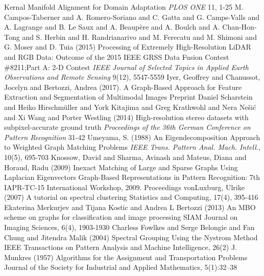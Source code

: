 \documentclass{beamer}
\begin{document}
\begin{frame}[allowframebreaks]
{\begin{thebibliography}{99}
      \newblock Kernal Manifold Alignment for Domain Adaptation
      \newblock \emph{PLOS ONE} 11, 1-25
     M. Campos-Taberner and A. Romero-Soriano and C. Gatta and G. Camps-Valls and A. Lagrange and B. Le Saux and A. Beaupère and A. Boulch and A. Chan-Hon-Tong and S. Herbin and H. Randrianarivo and M. Ferecatu and M. Shimoni and G. Moser and D. Tuia (2015)
      \newblock Processing of Extremely High-Resolution LiDAR and RGB Data: Outcome of the 2015 IEEE GRSS Data Fusion Contest \#8211;Part A: 2-D Contest
      \newblock \emph{IEEE Journal of Selected Topics in Applied Earth Observations and Remote Sensing} 9(12), 5547-5559
     Iyer, Geoffrey and Chanussot, Jocelyn and Bertozzi, Andrea (2017).
      \newblock A Graph-Based Approach for Feature Extraction and Segmentation of Multimodal Images
      \newblock Preprint
     Daniel Scharstein and Heiko Hirschm\"{u}ller and York Kitajima and Greg Krathwohl and Nera Ne\v{s}i\'{c} and Xi Wang and Porter Westling (2014)
      \newblock High-resolution stereo datasets with subpixel-accurate ground truth
      \newblock \emph{Proceedings of the 36th German Conference on Pattern Recognition} 31-42
     Umeyama, S. (1988)
      \newblock An Eigendecomposition Approach to Weighted Graph Matching Problems
      \newblock \emph{IEEE Trans. Pattern Anal. Mach. Intell.}, 10(5), 695-703
     Knossow, David and Sharma, Avinash and Mateus, Diana and Horaud, Radu (2009)
      \newblock Inexact Matching of Large and Sparse Graphs Using Laplacian Eigenvectors
      \newblock Graph-Based Representations in Pattern Recognition: 7th IAPR-TC-15 International Workshop, 2009. Proceedings
     vonLuxburg, Ulrike (2007)
      \newblock A tutorial on spectral clustering
      \newblock Statistics and Computing, 17(4), 395-416
     Ekaterina Merkurjev and Tijana Kostic and Andrea L Bertozzi (2013)
      \newblock An MBO scheme on graphs for classification and image processing
      \newblock SIAM Journal on Imaging Sciences, 6(4), 1903-1930
     Charless Fowlkes and Serge Belongie and Fan Chung and Jitendra Malik (2004)
      \newblock Spectral Grouping Using the Nystrom Method
      \newblock IEEE Transactions on Pattern Analysis and Machine Intelligence, 26(2)
     J. Munkres (1957)
      \newblock Algorithms for the Assignment and Transportation Problems
      \newblock Journal of the Society for Industrial and Applied Mathematics, 5(1):32–38
    \end{thebibliography}
  }
\end{frame}
\end{document}
